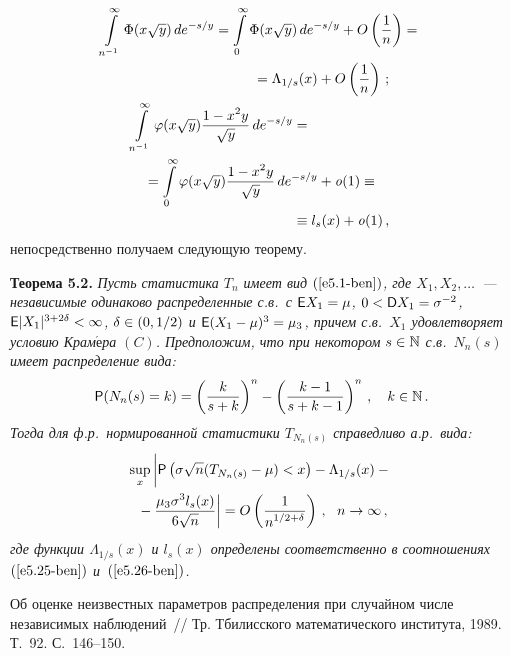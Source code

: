 \begin{multicols}{2}
\begin{gather}
\int\limits_{n^{-1}}^\infty \Phi(x\sqrt y)\, de^{-s/y} =
\int\limits_{0}^\infty \Phi(x\sqrt y) \,de^{-s/y} +
{O}\left(\fr{1}{n}\right) ={}\notag\\
\hspace*{30mm}{}= \Lambda_{1/s}(x) +
{O}\left(\fr{1}{n}\right)\,;\label{e5.25-ben}
\\
\hspace*{-20mm}\int\limits_{n^{-1}}^\infty \varphi(x\sqrt y) \fr{1-x^2y}{\sqrt
y}\, de^{-s/y} = {}\notag\\
{}=\int\limits_{0}^\infty \varphi(x\sqrt y)
\fr{1-x^2y}{\sqrt y}\, de^{-s/y} + {\it o}(1) \equiv{}\notag\\
\hspace*{40mm}{}\equiv l_{s}(x) +
{\it o}(1)\,,\label{e5.26-ben}
\end{gather}
непосредственно получаем следующую теорему.

\smallskip

\noindent
\textbf{Теорема 5.2.} \textit{Пусть статистика $T_n$ имеет вид $(\ref{e5.1-ben})$,
где $X_1,X_2,\ldots$~--- независимые одинаково распределенные с.в.\ с
${\sf E}X_1 \hm= \mu$, $0<{\sf D}X_1 \hm=\sigma^{-2}$, $\e
|X_1|^{3+2\delta} \hm< \infty$, $\delta\hm\in(0,1/2)$ и ${\sf E}(X_1 -
\mu)^3 \hm= \mu_3$, причем с.в.\ $X_1$ удовлетворяет условию
Крам$\acute{\mbox{е}}$ра $(C)$. Предположим, что при некотором $s\hm\in\N$ 
с.в.\ $N_n(s)$ имеет распределение вида:
$$
{{\sf P}}(N_n(s) = k) = \left( \displaystyle\frac{\displaystyle k\mathstrut}{\displaystyle s+k\mathstrut}\right)^n - \left( \displaystyle\frac{\displaystyle k -
1\mathstrut}{\displaystyle s+k-1\mathstrut}\right)^n\,, \ \ \   k\in\mathbb N\,.
$$
Тогда для ф.р.\ нормированной статистики $T_{N_n(s)}$ справедливо а.р.\ вида:
\begin{multline*}
\sup\limits_x \left| \vphantom{\fr{\mu_3\sigma^3l_s(x)}{6\sqrt{n}}}
{\p}\left(\sigma\sqrt {n} (T_{N_n(s)} - \mu) < x\right)
- \Lambda_{1/s}(x) - {}\right.\\
\left.{}-\fr{\mu_3\sigma^3l_s(x)}{6\sqrt{n}} \right| =
{O}\left(\fr{1}{n^{1/2+\delta}}\right)\,, \ \ n \to \infty\,,
\end{multline*}
где функции $\Lambda_{1/s}(x)$ и $l_s(x)$ определены соответственно
в соотношениях $(\ref{e5.25-ben})$ и~$(\ref{e5.26-ben})$.}

{\small\frenchspacing
{%
\begin{thebibliography}{99}

 Об оценке неизвестных параметров
распределения при случайном числе независимых наблюдений~// Тр.
Тбилисского математического института, 1989. Т.~92. С.~146--150.


\end{thebibliography}}}
\end{multicols}
